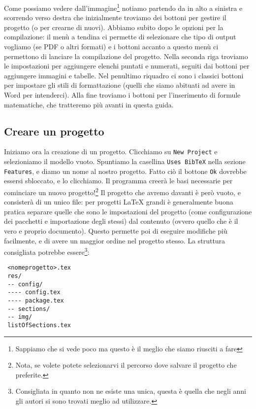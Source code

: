 Come possiamo vedere dall'immagine\footnote{Sappiamo che si vede poco
ma questo è il meglio che siamo riusciti a fare} notiamo partendo da in alto
a sinistra e scorrendo verso destra che inizialmente troviamo dei bottoni per
gestire il progetto (o per crearne di nuovi).
Abbiamo subito dopo le opzioni per la compilazione: il menù a tendina ci
permette di selezionare che tipo di output vogliamo (se PDF o altri formati) e
i bottoni accanto a questo menù ci permettono di lanciare la compilazione
del progetto.
Nella seconda riga troviamo le impostazioni per aggiungere elenchi puntati e
numerati, seguiti dai bottoni per aggiungere immagini e tabelle. Nel penultimo
riquadro ci sono i classici bottoni per impostare gli stili di formattazione
(quelli che siamo abituati ad avere in Word per intenderci).
Alla fine troviamo i bottoni per l'inserimento di formule matematiche, che
tratteremo più avanti in questa guida.

\subsection{Creare un progetto}

Iniziamo ora la creazione di un progetto.
Clicchiamo su \texttt{New Project} e selezioniamo il modello vuoto. Spuntiamo
la casellina \texttt{Uses BibTeX} nella sezione \texttt{Features}, e diamo un
nome al nostro progetto. Fatto ciò il bottone \texttt{Ok} dovrebbe essersi
sbloccato, e lo clicchiamo. Il programma creerà le basi necessarie per
cominciare un nuovo progetto!\footnote{Nota, se volete potete selezionarvi il
percorso dove salvare il progetto che preferite.}
Il progetto che avremo davanti è però vuoto, e consisterà di un unico file: per
progetti \LaTeX{} grandi è generalmente buona pratica separare quelle che sono
le impostazioni del progetto (come configurazione dei pacchetti e importazione
degli stessi) dal contenuto (ovvero quello che è il vero e proprio documento).
Questo permette poi di eseguire modifiche più facilmente, e di avere un maggior
ordine nel progetto stesso.
La struttura consigliata potrebbe essere\footnote{Consigliata in quanto non ne
esiste una unica, questa è quella che negli anni gli autori si sono trovati
meglio ad utilizzare.}:
\begin{verbatim}
 <nomeprogetto>.tex
 res/
 -- config/
 ---- config.tex
 ---- package.tex
 -- sections/
 -- img/
 listOfSections.tex
\end{verbatim}

